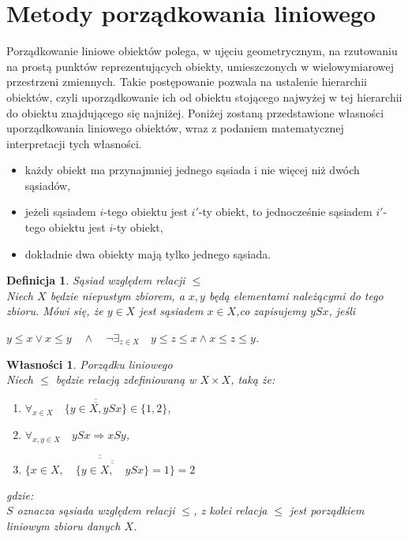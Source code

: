 \documentclass[12pt,a4paper]{report}
\newtheorem{definition}[theorem]{Definicja}
\newtheorem{wlasnosci}{Własności}
\begin{document}
\section{Metody porządkowania liniowego}
\noindent

Porządkowanie liniowe obiektów polega, w ujęciu geometrycznym, na rzutowaniu na prostą punktów reprezentujących obiekty, umieszczonych w wielowymiarowej przestrzeni zmiennych. Takie postępowanie pozwala na ustalenie hierarchii obiektów, czyli uporządkowanie ich od obiektu stojącego najwyżej w tej hierarchii do obiektu znajdującego się najniżej. Poniżej zostaną przedstawione własności uporządkowania liniowego obiektów, wraz z podaniem matematycznej interpretacji tych własności.\\

\begin{itemize}
\item każdy obiekt ma przynajmniej jednego sąsiada i nie więcej niż dwóch sąsiadów,
\item jeżeli sąsiadem $i$-tego obiektu jest $i'$-ty obiekt, to jednocześnie sąsiadem $i'$-tego obiektu jest $i$-ty obiekt,
\item dokładnie dwa obiekty mają tylko jednego sąsiada.\\
\end{itemize}
\noindent

\begin{definition}{Sąsiad względem relacji $\leq$\\ }
Niech  $X$ będzie niepustym zbiorem, a $x, y$ będą elementami należącymi do tego zbioru. Mówi się, że $y \in X$ jest sąsiadem $x \in X$,co zapisujemy $ySx$, jeśli
\begin{center}
$y \leq x \vee x \leq y \quad \wedge \quad  \lnot \exists_{z \in X} \quad y \leq z \leq x \wedge x \leq z \leq y$.\\
\end{center}
\end{definition}

\begin{wlasnosci}{Porządku liniowego\\}
Niech $\leq$ będzie relacją zdefiniowaną w $X \times X$, taką że:
\begin{enumerate}
\item $\forall_{x \in X} \quad \overline{\overline{\{y \in X, ySx\}}} \in \{1,2\}$,
\item $\forall_{x, y \in X} \quad ySx \Rightarrow xSy $,
\item $\overline{\overline{\{x \in X, \quad \overline{\overline{\{y \in X, \quad ySx \}}}=1\}}}=2 $
\end{enumerate}
gdzie:\\
$S$ oznacza sąsiada względem relacji $\leq$, z kolei relacja $\leq$ jest porządkiem liniowym zbioru danych $X$.
\end{wlasnosci}
\end{document}
